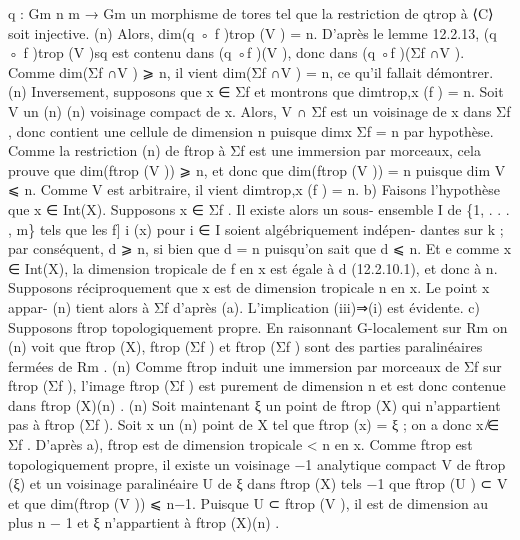 \documentclass[
  10pt,
]{article}
\newenvironment{Shaded}{}{}
\newcommand{\NormalTok}[1]{#1}
\begin{document}
\begin{Shaded}
\begin{Highlighting}[]
\NormalTok{q : Gm        n}
\NormalTok{      m → Gm un morphisme de tores tel que la restriction de qtrop à ⟨C⟩ soit injective.}
\NormalTok{                                                                            (n)}
\NormalTok{Alors, dim(q ◦ f )trop (V ) = n. D’après le lemme 12.2.13, (q ◦ f )trop (V )sq est contenu dans}
\NormalTok{(q ◦f )(V ), donc dans (q ◦f )(Σf ∩V ). Comme dim(Σf ∩V ) ⩾ n, il vient dim(Σf ∩V ) = n,}
\NormalTok{ce qu’il fallait démontrer.}
\NormalTok{                                          (n)}
\NormalTok{   Inversement, supposons que x ∈ Σf et montrons que dimtrop,x (f ) = n. Soit V un}
\NormalTok{                                         (n)                                (n)}
\NormalTok{voisinage compact de x. Alors, V ∩ Σf est un voisinage de x dans Σf , donc contient}
\NormalTok{une cellule de dimension n puisque dimx Σf = n par hypothèse. Comme la restriction}
\NormalTok{               (n)}
\NormalTok{de ftrop à Σf est une immersion par morceaux, cela prouve que dim(ftrop (V )) ⩾ n,}
\NormalTok{et donc que dim(ftrop (V )) = n puisque dim V ⩽ n. Comme V est arbitraire, il vient}
\NormalTok{dimtrop,x (f ) = n.}
\NormalTok{   b) Faisons l’hypothèse que x ∈ Int(X). Supposons x ∈ Σf . Il existe alors un sous{-}}
\NormalTok{ensemble I de \{1, . . . , m\} tels que les f]   i (x) pour i ∈ I soient algébriquement indépen{-}}
\NormalTok{dantes sur k ; par conséquent, d ⩾ n, si bien que d = n puisqu’on sait que d ⩽ n. Et}
\NormalTok{              e}
\NormalTok{comme x ∈ Int(X), la dimension tropicale de f en x est égale à d (12.2.10.1), et donc}
\NormalTok{à n.}
\NormalTok{   Supposons réciproquement que x est de dimension tropicale n en x. Le point x appar{-}}
\NormalTok{                  (n)}
\NormalTok{tient alors à Σf d’après (a).}
\NormalTok{   L’implication (iii)⇒(i) est évidente.}
\NormalTok{   c) Supposons ftrop topologiquement propre. En raisonnant G{-}localement sur Rm on}
\NormalTok{                                           (n)}
\NormalTok{voit que ftrop (X), ftrop (Σf ) et ftrop (Σf ) sont des parties paralinéaires fermées de Rm .}
\NormalTok{                                                                                           (n)}
\NormalTok{Comme ftrop induit une immersion par morceaux de Σf sur ftrop (Σf ), l’image ftrop (Σf )}
\NormalTok{est purement de dimension n et est donc contenue dans ftrop (X)(n) .}
\NormalTok{                                                                         (n)}
\NormalTok{  Soit maintenant ξ un point de ftrop (X) qui n’appartient pas à ftrop (Σf ). Soit x un}
\NormalTok{                                                     (n)}
\NormalTok{point de X tel que ftrop (x) = ξ ; on a donc x ̸∈ Σf . D’après a), ftrop est de dimension}
\NormalTok{tropicale \textless{} n en x. Comme ftrop est topologiquement propre, il existe un voisinage}
\NormalTok{                             −1}
\NormalTok{analytique compact V de ftrop   (ξ) et un voisinage paralinéaire U de ξ dans ftrop (X) tels}
\NormalTok{      −1}
\NormalTok{que ftrop (U ) ⊂ V et que dim(ftrop (V )) ⩽ n−1. Puisque U ⊂ ftrop (V ), il est de dimension}
\NormalTok{au plus n − 1 et ξ n’appartient à ftrop (X)(n) .}


\end{Highlighting}
\end{Shaded}
\end{document}
